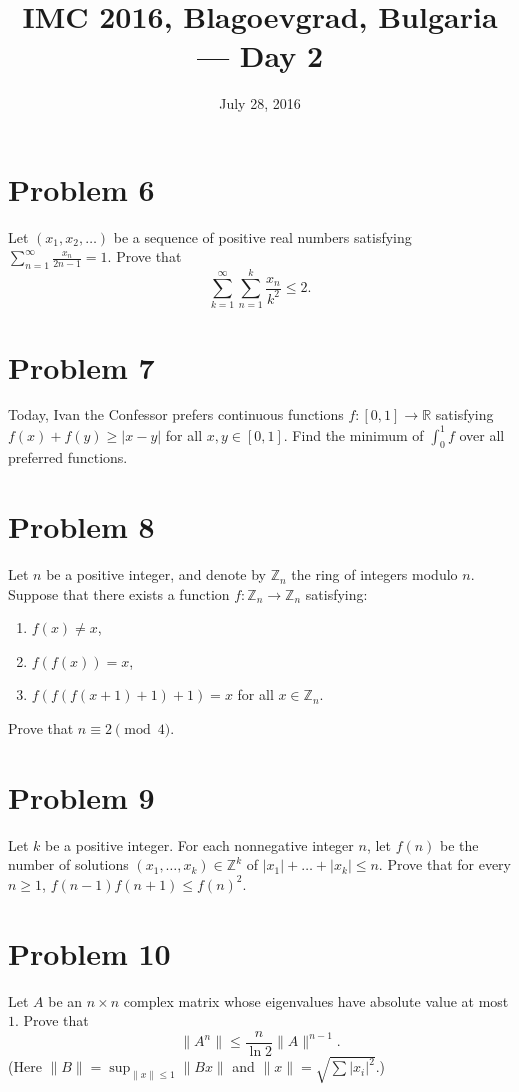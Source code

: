 \documentclass{article}
\title{IMC 2016, Blagoevgrad, Bulgaria --- Day 2}
\date{July 28, 2016}
\begin{document}
\maketitle

\section*{Problem 6}
Let $(x_1, x_2, \dots)$ be a sequence of positive real numbers satisfying $\sum_{n=1}^\infty \frac{x_n}{2n-1} = 1$. Prove that
\[ \sum_{k=1}^\infty \sum_{n=1}^k \frac{x_n}{k^2} \le 2. \]

\section*{Problem 7}
Today, Ivan the Confessor prefers continuous functions $f : [0,1] \to \mathbb{R}$ satisfying $f(x) + f(y) \ge |x - y|$ for all $x, y \in [0,1]$. Find the minimum of $\int_0^1 f$ over all preferred functions.

\section*{Problem 8}
Let $n$ be a positive integer, and denote by $\mathbb{Z}_n$ the ring of integers modulo $n$. Suppose that there exists a function $f : \mathbb{Z}_n \to \mathbb{Z}_n$ satisfying:
\begin{enumerate}
\item[(i)] $f(x) \ne x$,
\item[(ii)] $f(f(x)) = x$,
\item[(iii)] $f(f(f(x+1)+1)+1) = x$ for all $x \in \mathbb{Z}_n$.
\end{enumerate}
Prove that $n \equiv 2 \pmod 4$.

\section*{Problem 9}
Let $k$ be a positive integer. For each nonnegative integer $n$, let $f(n)$ be the number of solutions $(x_1, \dots, x_k) \in \mathbb{Z}^k$ of $|x_1| + \dots + |x_k| \le n$. Prove that for every $n \ge 1$, $f(n-1)f(n+1) \le f(n)^2$.

\section*{Problem 10}
Let $A$ be an $n \times n$ complex matrix whose eigenvalues have absolute value at most $1$. Prove that
\[ \|A^n\| \le \frac{n}{\ln 2} \|A\|^{n-1}. \]
(Here $\|B\| = \sup_{\|x\| \le 1} \|Bx\|$ and $\|x\| = \sqrt{\sum |x_i|^2}$.)
\end{document}
